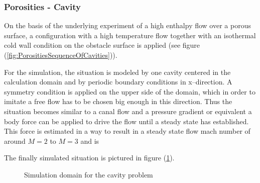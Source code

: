 \documentclass{report}
\begin{document}
\subsubsection{Porosities - Cavity}
\label{sec:SimuSetup_Cavity}
On the basis of the underlying experiment of a high enthalpy flow over a porous surface, a configuration with a high temperature %
flow together with an isothermal cold wall condition on the obstacle surface is applied (see figure (\ref{fig:PorositiesSequenceOfCavities})). 

For the simulation, the situation is modeled by one cavity centered in the calculation domain and by periodic boundary conditions in x--direction. A symmetry condition is applied on the upper side of the domain, which in order to imitate a free flow has to be chosen big enough in this direction. Thus the situation becomes similar to a canal flow and a pressure gradient or equivalent a body force can be applied to drive the flow until a steady state has established. This force is estimated in a way to result in a steady state flow mach number of around $M=2$ to $M=3$ and is 

The finally simulated situation is pictured in figure (\ref{fig:PorositiesCavitiesSimuDomain}).


\begin{figure}[!htbp]
  \centering
  \caption{Simulation domain for the cavity problem}
  \label{fig:PorositiesCavitiesSimuDomain}
\end{figure}
\end{document}
